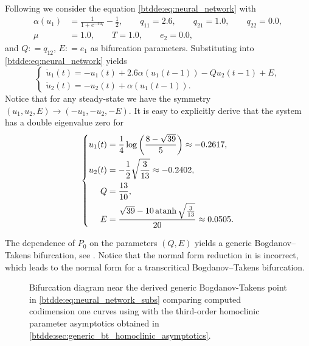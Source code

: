 Following \cite{giannakopoulos2001bifurcations} we consider the equation \cref{btdde:eq:neural_network} with
\begin{align*}
\alpha(u_1) & = \frac{1}{1 + e^{-4u_1}}-\frac{1}{2},\qquad q_{11} = 2.6,\qquad q_{21} = 1.0,\qquad q_{22} = 0.0,\\
\mu & = 1.0,\qquad T = 1.0,\qquad e_2 = 0.0,
\end{align*}
and $Q: = q_{12},\,E: = e_1$ as bifurcation parameters. Substituting
into \cref{btdde:eq:neural_network} yields
\begin{equation}
\label{btdde:eq:neural_network_subs}
\begin{cases}
\dot{u}_1(t) = -u_1(t) + 2.6\alpha(u_1(t - 1))-Qu_2(t - 1) + E,\\
\dot{u}_2(t) = -u_2(t) + \alpha(u_1(t - 1)).
\end{cases}
\end{equation}
Notice that for any steady-state we have the symmetry
$(u_1,u_2,E)\rightarrow(-u_1,-u_2,-E)$. It is easy to explicitly derive that the system has a double eigenvalue zero for
\begin{equation}
    \left\{
    \begin{aligned}
        u_1(t) &= \frac14 \log\left(\frac{8 - \sqrt{39}}5\right) \approx -0.2617, \\
        u_2(t) &= -\frac12 \sqrt{\frac{3}{13}} \approx -0.2402, \\
        Q &= \frac{13}{10}, \\
        E &= \frac{\sqrt{39} - 10\operatorname{atanh} \sqrt{\frac{3}{13}}}{20} \approx 0.0505.
    \end{aligned}\right.
\end{equation}

The dependence of $P_0$ on the parameters $(Q,E)$ yields a generic
Bogdanov--Takens bifurcation, see \cite{giannakopoulos2001bifurcations}. Notice
that the normal form reduction in \cite{giannakopoulos2001bifurcations} is
incorrect, which leads to the normal form for a transcritical Bogdanov--Takens
bifurcation.

\begin{figure}[ht]
    \centering
    \caption{Bifurcation diagram near the derived generic Bogdanov-Takens point in
        \cref{btdde:eq:neural_network_subs} comparing computed codimension one curves using
        \DDEBIFTOOL with the third-order homoclinic parameter asymptotics obtained
        in \cref{btdde:sec:generic_bt_homoclinic_asymptotics}.}
    \label{btdde:fig:NeuralNetworkCompareParameters}
\end{figure}

